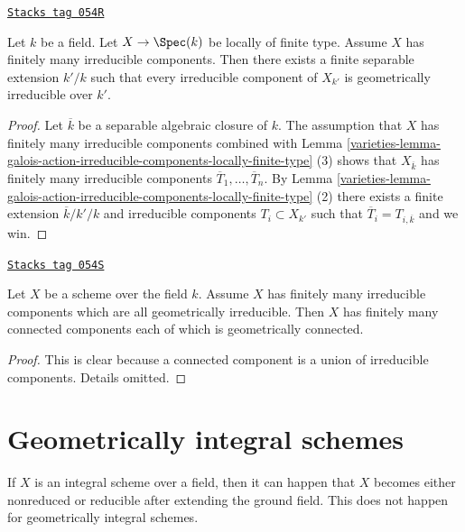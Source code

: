 \begin{lemma}
\label{varieties-lemma-finite-extension-geometrically-irreducible-components}
\href{https://stacks.math.columbia.edu/tag/054R}{\texttt{Stacks tag 054R}}

Let $k$ be a field.
Let $X \to \Spec(k)$ be locally of finite type.
Assume $X$ has finitely many irreducible components.
Then there exists a finite separable extension $k'/k$
such that every irreducible component of $X_{k'}$
is geometrically irreducible over $k'$.
\end{lemma}

\begin{proof}

Let $\overline{k}$ be a separable algebraic closure of $k$.
The assumption that $X$ has finitely many irreducible components
combined with
Lemma \ref{varieties-lemma-galois-action-irreducible-components-locally-finite-type} (3)
shows that $X_{\overline{k}}$ has finitely many irreducible components
$\overline{T}_1, \ldots, \overline{T}_n$. By
Lemma \ref{varieties-lemma-galois-action-irreducible-components-locally-finite-type} (2)
there exists a finite extension $\overline{k}/k'/k$ and
irreducible components $T_i \subset X_{k'}$ such that
$\overline{T}_i = T_{i, \overline{k}}$ and we win.
\end{proof}

\begin{lemma}
\label{varieties-lemma-irreducible-components-geometrically-irreducible}
\href{https://stacks.math.columbia.edu/tag/054S}{\texttt{Stacks tag 054S}}

Let $X$ be a scheme over the field $k$.
Assume $X$ has finitely many irreducible components which are
all geometrically irreducible.
Then $X$ has finitely many connected components each of which is
geometrically connected.
\end{lemma}

\begin{proof}
This is clear because a connected component is a union of irreducible
components. Details omitted.
\end{proof}

\section{Geometrically integral schemes}
\label{varieties-section-geometrically-integral}
If $X$ is an integral scheme over a field, then it can happen that $X$
becomes either nonreduced or reducible after extending the ground field.
This does not happen for geometrically integral schemes.

